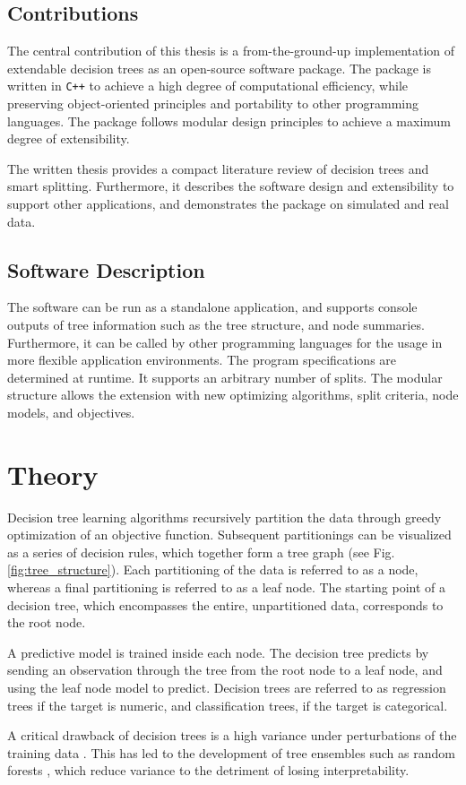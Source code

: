 \documentclass[a4paper, 11pt]{article}
\begin{document}
\subsection{Contributions} The central contribution of this thesis is a from-the-ground-up implementation of extendable decision trees as an open-source software package. The package is written in \texttt{C++} to achieve a high degree of computational efficiency, while preserving object-oriented principles and portability to other programming languages. The package follows modular design principles to achieve a maximum degree of extensibility.
\par
The written thesis provides a compact literature review of decision trees and smart splitting. Furthermore, it describes the software design and extensibility to support other applications, and demonstrates the package on simulated and real data.

\subsection{Software Description}

The software can be run as a standalone application, and supports console outputs of tree information such as the tree structure, and node summaries. Furthermore, it can be called by other programming languages for the usage in more flexible application environments. The program specifications are determined at runtime. It supports an arbitrary number of splits. 
The modular structure allows the extension with 
new optimizing algorithms, split criteria, node models, and objectives. 

\section{Theory}

Decision tree learning algorithms recursively partition the data through greedy optimization of an objective function. Subsequent partitionings can be visualized as a series of decision rules, which together form a tree graph (see Fig. \ref{fig:tree_structure}). Each partitioning of the data is referred to as a node, whereas a final partitioning is referred to as a leaf node. The starting point of a decision tree, which encompasses the entire, unpartitioned data, corresponds to the root node.
\par
A predictive model is trained inside each node.
The decision tree predicts by sending an observation through the tree from the root node to a leaf node, and using the leaf node model to predict.
Decision trees are referred to as regression trees if the target is numeric, and classification trees, if the target is categorical.
\par
A critical drawback of decision trees is a high variance under perturbations of the training data \cite{hastie_elemstatlearn}. This has led to the development of tree ensembles such as random forests \cite{breiman_randomforests}, which reduce variance to the detriment of losing interpretability.
\end{document}
